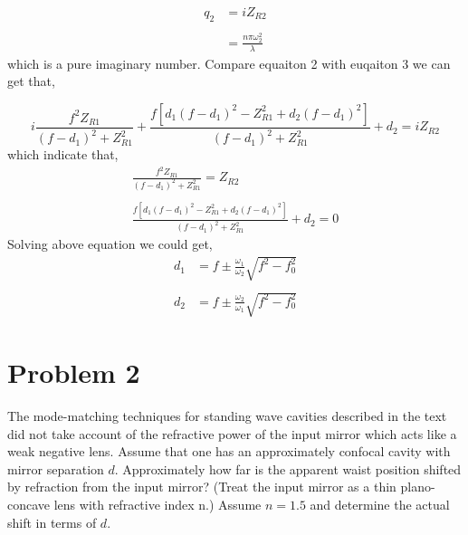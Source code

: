 \documentclass{article}
\begin{document}
\begin{equation}\label{eq3}
        \begin{aligned}
        q_2&=iZ_{R2} \\
        \\ 
        &=\frac{n\pi\omega_{2}^2}{\lambda}
        \end{aligned}
\end{equation}
which is a pure imaginary number.
Compare equaiton 2 with euqaiton 3 we can get that,

\begin{equation}
    i\frac{f^{2} Z_{R1}}{(f-d_{1})^2+Z_{R1}^2}+\frac{f[d_1(f-d_1)^2-Z_{R1}^2+d_2(f-d_1)^2]}{(f-d_1)^2+Z_{R1}^2}+d_2=iZ_{R2}
\end{equation}
which indicate that,
\begin{equation}\label{eq5}
	\begin{array}{l}
	\frac{f^{2} Z_{R1}}{(f-d_{1})^2+Z_{R1}^2}=Z_{R2}\\
	\\
	\frac{f[d_1(f-d_1)^2-Z_{R1}^2+d_2(f-d_1)^2]}{(f-d_1)^2+Z_{R1}^2}+d_2=0
	\end{array}
\end{equation}
Solving above equation we could get,
\begin{equation}
    \begin{aligned}
    d_1&=f\pm\frac{\omega_1}{\omega_2}\sqrt{f^2-f_{0}^2} \\
    \\
    d_2&=f\pm\frac{\omega_2}{\omega_1}\sqrt{f^2-f_{0}^2}
    \end{aligned}
\end{equation}



\section{Problem 2}
The mode-matching techniques for standing wave cavities described in the text
did not take account of the refractive power of the input mirror which acts like
a weak negative lens. Assume that one has an approximately confocal cavity
with mirror separation $d$. Approximately how far is the apparent waist position
shifted by refraction from the input mirror? (Treat the input mirror as a thin
plano-concave lens with refractive index n.) Assume $n = 1.5$ and determine the
actual shift in terms of $d$.
\end{document}
